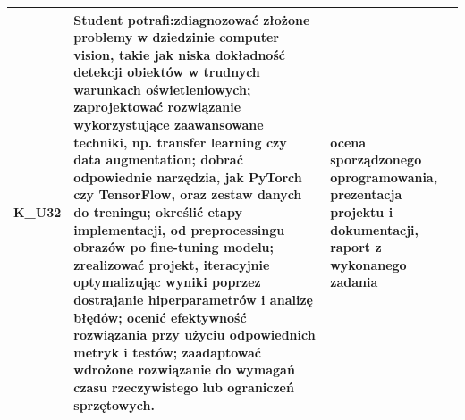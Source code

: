 \documentclass[12pt, a4paper]{article}
\begin{document}
{\begin{longtable}{m{1.6cm}m{9.0cm}m{4.2cm}}
  \rowcolor{tableRowAlt} K\_U32 & Student potrafi:zdiagnozować złożone problemy w dziedzinie computer vision, takie jak niska dokładność detekcji obiektów w trudnych warunkach oświetleniowych; zaprojektować rozwiązanie wykorzystujące zaawansowane techniki, np. transfer learning czy data augmentation; dobrać odpowiednie narzędzia, jak PyTorch czy TensorFlow, oraz zestaw danych do treningu; określić etapy implementacji, od preprocessingu obrazów po fine-tuning modelu; zrealizować projekt, iteracyjnie optymalizując wyniki poprzez dostrajanie hiperparametrów i analizę błędów; ocenić efektywność rozwiązania przy użyciu odpowiednich metryk i testów; zaadaptować wdrożone rozwiązanie do wymagań czasu rzeczywistego lub ograniczeń sprzętowych. & ocena sporządzonego oprogramowania, prezentacja projektu i dokumentacji, raport z wykonanego zadania \\
\bottomrule
\end{longtable}}
\end{document}
